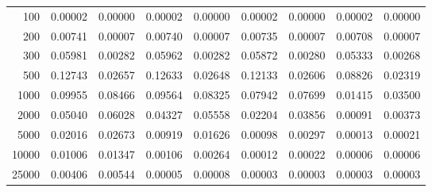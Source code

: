 \begin{table}[ht]
\begin{tabular}{r|c|c|c|c|c|c|c|c}
    100   & 0.00002 & 0.00000 & 0.00002 & 0.00000 & 0.00002 & 0.00000 & 0.00002 & 0.00000 \\
    200   & 0.00741 & 0.00007 & 0.00740 & 0.00007 & 0.00735 & 0.00007 & 0.00708 & 0.00007 \\
    300   & 0.05981 & 0.00282 & 0.05962 & 0.00282 & 0.05872 & 0.00280 & 0.05333 & 0.00268 \\
    500   & 0.12743 & 0.02657 & 0.12633 & 0.02648 & 0.12133 & 0.02606 & 0.08826 & 0.02319 \\
    1000  & 0.09955 & 0.08466 & 0.09564 & 0.08325 & 0.07942 & 0.07699 & 0.01415 & 0.03500 \\
    2000  & 0.05040 & 0.06028 & 0.04327 & 0.05558 & 0.02204 & 0.03856 & 0.00091 & 0.00373 \\
    5000  & 0.02016 & 0.02673 & 0.00919 & 0.01626 & 0.00098 & 0.00297 & 0.00013 & 0.00021 \\
    10000 & 0.01006 & 0.01347 & 0.00106 & 0.00264 & 0.00012 & 0.00022 & 0.00006 & 0.00006 \\
    25000 & 0.00406 & 0.00544 & 0.00005 & 0.00008 & 0.00003 & 0.00003 & 0.00003 & 0.00003 \\ \cline{1-9}
    \end{tabular}
    \label{tab:XRayEffODE}
\end{table}